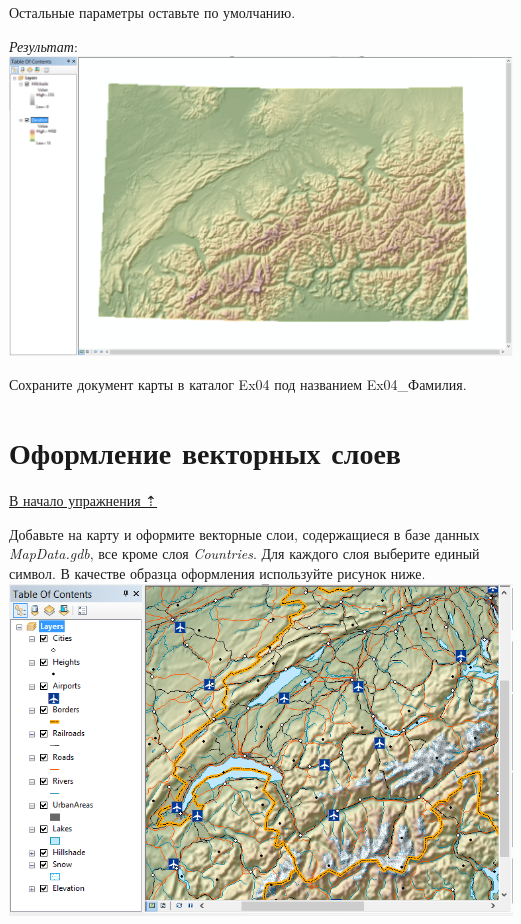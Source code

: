 \documentclass[]{book}
\theoremstyle{definition}
\theoremstyle{definition}
\theoremstyle{definition}
\theoremstyle{remark}
\begin{document}
\begin{enumerate}
  Остальные параметры оставьте по умолчанию.

  \emph{Результат}: \includegraphics{images/Ex04/image13.png}
\end{enumerate}

Сохраните документ карты в каталог Ex04 под названием Ex04\_Фамилия.

\hypertarget{map-design-general-vector}{%
\section{Оформление векторных слоев}\label{map-design-general-vector}}

\protect\hyperlink{map-design-general}{В начало упражнения ⇡}

Добавьте на карту и оформите векторные слои, содержащиеся в базе данных
\emph{MapData.gdb}, все кроме слоя \emph{Countries}. Для каждого слоя
выберите единый символ. В качестве образца оформления используйте
рисунок ниже. \includegraphics{images/Ex04/image14.png}
\end{document}
